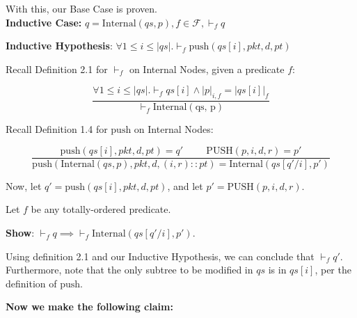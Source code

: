 \documentclass{amsart}
\begin{document}
With this, our Base Case is proven.\\[10pt]

\textbf{Inductive Case:} $q = \text{Internal}(qs, p), f \in \mathcal{F}, \vdash_f q$\newline

\textbf{Inductive Hypothesis}: $\forall 1 \leq i \leq |qs|. \vdash_f \text{push}(qs[i], pkt, d, pt)$\newline

Recall Definition 2.1 for $\vdash_f$ on Internal Nodes, given a predicate $f$:

$$\frac{\forall 1 \leq i \leq |qs|. \vdash_f qs[i] \land |p|_{i, f} = |qs[i]|_f}{\vdash_f \text{Internal}(\text{qs, p})}$$\newline

Recall Definition 1.4 for $\text{push}$ on Internal Nodes:

$$\frac{\text{push}(qs[i], pkt, d, pt) = q' \hspace{1cm} \text{PUSH}(p, i, d, r) = p'}{\text{push}(\text{Internal}(qs, p), pkt, d, (i, r) :: pt) = \text{Internal}(qs[q'/i], p')}$$\newline

Now, let $q' = \text{push}(qs[i], pkt, d, pt)$, and let $p' = \text{PUSH}(p, i, d, r)$.\newline

\noindent Let $f$ be any totally-ordered predicate.\newline

\textbf{Show}: $\vdash_f q \implies \vdash_f \text{Internal}(qs[q'/i], p')$.\newline

Using definition 2.1 and our Inductive Hypothesis, we can conclude that $\vdash_f q'$. Furthermore, note that the only subtree to be modified in $qs$ is in $qs[i]$, per the definition of $\text{push}$.\newline

\textbf{Now we make the following claim:}\\[-20pt]
\end{document}
